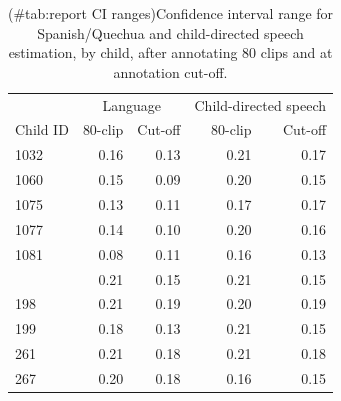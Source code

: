 \documentclass[
]{article}
\begin{document}
\begin{table}[!h]

\caption{(\#tab:report CI ranges)Confidence interval range for Spanish/Quechua and child-directed speech estimation, by child, after annotating 80 clips and at annotation cut-off.}
\centering
\begin{tabular}[t]{lrrrr}
\toprule
\multicolumn{1}{c}{ } & \multicolumn{2}{c}{Language} & \multicolumn{2}{c}{Child-directed speech} \\
\cmidrule(l{3pt}r{3pt}){2-3} \cmidrule(l{3pt}r{3pt}){4-5}
Child ID & 80-clip & Cut-off & 80-clip & Cut-off\\
\midrule
1032 & 0.16 & 0.13 & 0.21 & 0.17\\
1060 & 0.15 & 0.09 & 0.20 & 0.15\\
1075 & 0.13 & 0.11 & 0.17 & 0.17\\
1077 & 0.14 & 0.10 & 0.20 & 0.16\\
1081 & 0.08 & 0.11 & 0.16 & 0.13\\
\addlinespace
179 & 0.21 & 0.15 & 0.21 & 0.15\\
198 & 0.21 & 0.19 & 0.20 & 0.19\\
199 & 0.18 & 0.13 & 0.21 & 0.15\\
261 & 0.21 & 0.18 & 0.21 & 0.18\\
267 & 0.20 & 0.18 & 0.16 & 0.15\\
\bottomrule
\end{tabular}
\end{table}
\end{document}
